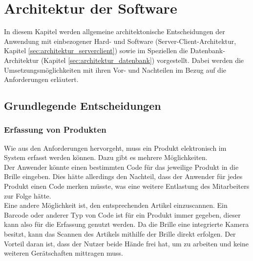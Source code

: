 \chapter{Architektur der Software}
\label{cha:architektur}
\sloppy

In diesem Kapitel werden allgemeine architektonische Entscheidungen der Anwendung mit einbezogener Hard- und Software (Server-Client-Architektur, Kapitel \ref{sec:architektur_serverclient}) sowie im Speziellen die Datenbank-Architektur (Kapitel \ref{sec:architektur_datenbank}) vorgestellt. Dabei werden die Umsetzungsmöglichkeiten mit ihren Vor- und Nachteilen im Bezug auf die Anforderungen erläutert.

\section{Grundlegende Entscheidungen}
\label{sec:grund_entscheidungen}

\subsection{Erfassung von Produkten}
Wie aus den Anforderungen hervorgeht, muss ein Produkt elektronisch im System erfasst werden können. Dazu gibt es mehrere Möglichkeiten.\\ 
Der Anwender könnte einen bestimmten Code für das jeweilige Produkt in die Brille eingeben. Dies hätte allerdings den Nachteil, dass der Anwender für jedes Produkt einen Code merken müsste, was eine weitere Entlastung des Mitarbeiters zur Folge hätte.\\
Eine andere Möglichkeit ist, den entsprechenden Artikel einzuscannen. Ein Barcode oder anderer Typ von Code ist für ein Produkt immer gegeben, dieser kann also für die Erfassung genutzt werden. Da die Brille eine integrierte Kamera besitzt, kann das Scannen des Artikels mithilfe der Brille direkt erfolgen. Der Vorteil daran ist, dass der Nutzer beide Hände frei hat, um zu arbeiten und keine weiteren Gerätschaften mittragen muss.

